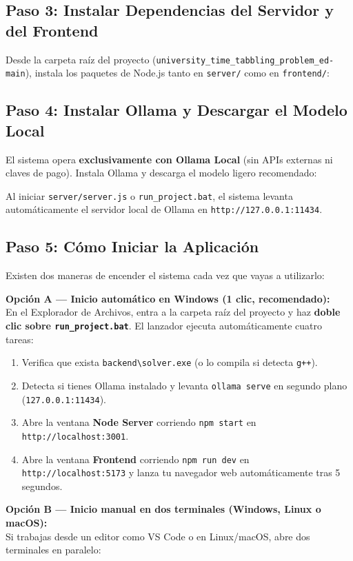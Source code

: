 \documentclass[11pt,letterpaper]{article}
\newcommand{\subseccionUPV}[1]{%
    \subsection{\texorpdfstring{\textcolor{upvazul}{#1}}{#1}}%
}
\newcommand{\cajaCodigo}[1]{%
    \par\smallskip\noindent
    \colorbox{grisclaro}{%
        \parbox{\dimexpr\linewidth-2\fboxsep\relax}{%
            \vspace{3pt}{\ttfamily\small #1}\vspace{3pt}%
        }%
    }\par\smallskip
}
\begin{document}
\subseccionUPV{Paso 3: Instalar Dependencias del Servidor y del Frontend}
Desde la carpeta raíz del proyecto (\texttt{university\_time\_tabbling\_problem\_ed-main}), instala los paquetes de Node.js tanto en \texttt{server/} como en \texttt{frontend/}:
\cajaCodigo{%
cd server\\
npm install\\[4pt]
cd ../frontend\\
npm install\\
cd ..%
}

\subseccionUPV{Paso 4: Instalar Ollama y Descargar el Modelo Local}
El sistema opera \textbf{exclusivamente con Ollama Local} (sin APIs externas ni claves de pago). Instala Ollama y descarga el modelo ligero recomendado:
\cajaCodigo{%
winget install Ollama.Ollama\\
ollama pull qwen2.5:3b%
}
Al iniciar \texttt{server/server.js} o \texttt{run\_project.bat}, el sistema levanta automáticamente el servidor local de Ollama en \texttt{http://127.0.0.1:11434}.

\subseccionUPV{Paso 5: Cómo Iniciar la Aplicación}

Existen dos maneras de encender el sistema cada vez que vayas a utilizarlo:

\textbf{Opción A --- Inicio automático en Windows (1 clic, recomendado):}\\
En el Explorador de Archivos, entra a la carpeta raíz del proyecto y haz \textbf{doble clic sobre \texttt{run\_project.bat}}. El lanzador ejecuta automáticamente cuatro tareas:
\begin{enumerate}
    \item Verifica que exista \texttt{backend\textbackslash solver.exe} (o lo compila si detecta \texttt{g++}).
    \item Detecta si tienes Ollama instalado y levanta \texttt{ollama serve} en segundo plano (\texttt{127.0.0.1:11434}).
    \item Abre la ventana \textbf{Node Server} corriendo \texttt{npm start} en \texttt{http://localhost:3001}.
    \item Abre la ventana \textbf{Frontend} corriendo \texttt{npm run dev} en \texttt{http://localhost:5173} y lanza tu navegador web automáticamente tras 5 segundos.
\end{enumerate}

\textbf{Opción B --- Inicio manual en dos terminales (Windows, Linux o macOS):}\\
Si trabajas desde un editor como VS Code o en Linux/macOS, abre dos terminales en paralelo:
\end{document}
